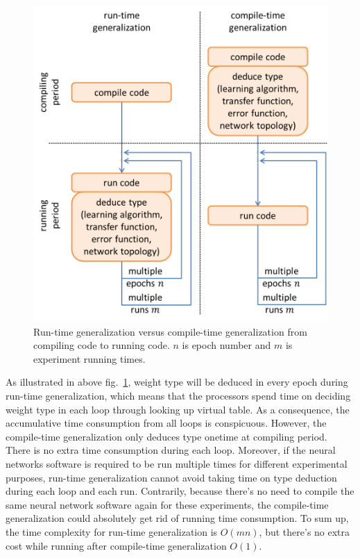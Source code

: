 \documentclass[procedia]{easychair}
\begin{document}
\begin{figure}[tb]
    \begin{centering}
        \includegraphics[scale=0.5]{../../pic/run_vs_compile.png}
        \caption{Run-time generalization versus compile-time generalization from compiling code to running code.  $n$ is epoch number and $m$ is experiment running times.}
        \label{fig:run_vs_compile}
	\end{centering}
\end{figure}

As illustrated in above fig.~\ref{fig:run_vs_compile}, weight type will be deduced in every epoch during run-time generalization, which means that the processors spend time on deciding weight type in each loop through looking up virtual table.  As a consequence, the accumulative time consumption from all loops is conspicuous.  However, the compile-time generalization only deduces type onetime at compiling period.  There is no extra time consumption during each loop.  Moreover, if the neural networks software is required to be run multiple times for different experimental purposes, run-time generalization cannot avoid taking time on type deduction during each loop and each run.  Contrarily, because there’s no need to compile the same neural network software again for these experiments, the compile-time generalization could absolutely get rid of running time consumption.  To sum up, the time complexity for run-time generalization is $O(mn)$, but there’s no extra cost while running after compile-time generalization $O(1)$.
\end{document}
